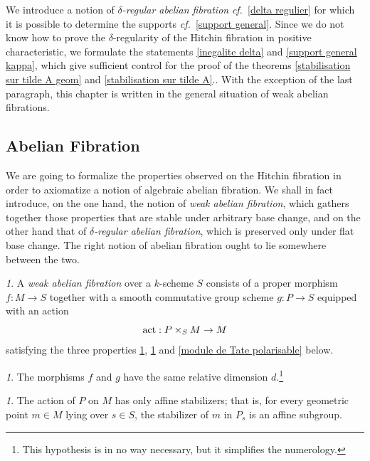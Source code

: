 \documentclass[12pt,english]{smfart}
\numberwithin{equation}{subsection}
\theoremstyle{remark}
\newtheorem{numero}[equation]{}
\newcommand\act{{\rm act}}
\newcommand\cf{{\it cf.\ }}
\begin{document}
We introduce a notion of {\em $\delta$-regular abelian fibration} \cf \ref{delta regulier} for which it is possible to determine the supports \cf \ref{support general}. Since we do not know how to prove the $\delta$-regularity of the Hitchin fibration in positive characteristic, we formulate the statements \ref{inegalite delta} and \ref{support general kappa}, which give sufficient control
for the proof of the theorems \ref{stabilisation sur tilde A geom} and \ref{stabilisation sur tilde A}.. With the exception of the last paragraph, this chapter is written in the general situation of weak abelian fibrations.

\subsection{Abelian Fibration}\label{subsection : fibration abelienne}

We are going to formalize the properties observed on the Hitchin fibration in order to axiomatize a notion of algebraic abelian fibration. We shall in fact introduce, on the one hand, the notion of {\em weak abelian fibration}, which gathers together those properties that are stable under arbitrary base change, and on the other hand that of {\em $\delta$-regular abelian fibration}, which is preserved only under flat base change. The right notion of abelian fibration ought to lie somewhere between the two.

\begin{numero}\label{fibration abelienne faible}
A {\em weak abelian fibration} over a $k$-scheme $S$ consists of a proper morphism $f:M\rightarrow S$ together with a smooth commutative group scheme $g:P\rightarrow S$ equipped with an action
$$\act:P\times_S M\rightarrow M$$
satisfying the three properties \ref{meme dimension}, \ref{stabilisateur affine} and \ref{module de Tate polarisable} below.
\end{numero}

\begin{numero}\label{meme dimension}
The morphisms $f$ and $g$ have the same relative dimension $d$.\footnote{This hypothesis is in no way necessary, but it simplifies the numerology.}
\end{numero}

\begin{numero}\label{stabilisateur affine}
The action of $P$ on $M$ has only affine stabilizers; that is, for every geometric point $m\in M$ lying over $s\in S$, the stabilizer of $m$ in $P_s$ is an affine subgroup.
\end{numero}
\end{document}
